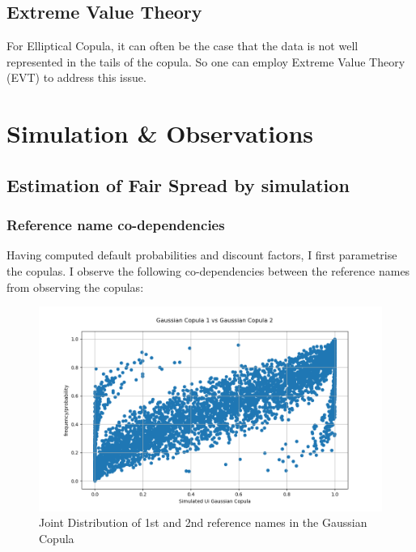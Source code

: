 \documentclass{report}
\theoremstyle{plain}
\theoremstyle{definition}
\begin{document}
\section{Extreme Value Theory}

For Elliptical Copula, it can often be the case that the data is not well represented in the tails of the copula. So one can employ Extreme Value Theory (EVT) to address this issue.\\


\chapter{Simulation \& Observations}

\section{Estimation of Fair Spread by simulation}

\subsection{Reference name co-dependencies}

Having computed default probabilities and discount factors, I first parametrise the copulas. I observe the following co-dependencies between the reference names from observing the copulas:

\begin{figure}[H]
	\begin{center}
		\includegraphics[width=15cm]{Gaussian_Copula_1_vs_Gaussian_Copula_2.png}
		\caption{Joint Distribution of 1st and 2nd reference names in the Gaussian Copula} 
		\label{Gaussian_Copula_1_vs_Gaussian_Copula_2}
	\end{center}
\end{figure}
\end{document}
